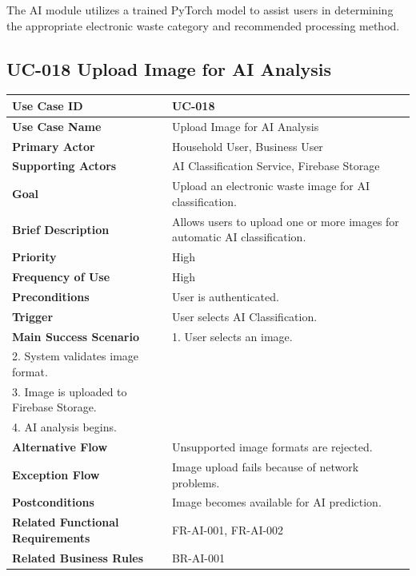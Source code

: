 The AI module utilizes a trained PyTorch model to assist users in
determining the appropriate electronic waste category and recommended
processing method.

\subsection{UC-018 Upload Image for AI Analysis}

\begin{longtable}{|p{4cm}|p{10cm}|}

\hline
\textbf{Use Case ID} &
UC-018 \\
\hline

\textbf{Use Case Name} &
Upload Image for AI Analysis \\
\hline

\textbf{Primary Actor} &
Household User, Business User \\
\hline

\textbf{Supporting Actors} &
AI Classification Service, Firebase Storage \\
\hline

\textbf{Goal} &
Upload an electronic waste image for AI classification. \\
\hline

\textbf{Brief Description} &
Allows users to upload one or more images for automatic AI
classification. \\
\hline

\textbf{Priority} &
High \\
\hline

\textbf{Frequency of Use} &
High \\
\hline

\textbf{Preconditions} &
User is authenticated. \\
\hline

\textbf{Trigger} &
User selects AI Classification. \\
\hline

\textbf{Main Success Scenario} &
1. User selects an image.\\
2. System validates image format.\\
3. Image is uploaded to Firebase Storage.\\
4. AI analysis begins.\\
\hline

\textbf{Alternative Flow} &
Unsupported image formats are rejected.\\
\hline

\textbf{Exception Flow} &
Image upload fails because of network problems.\\
\hline

\textbf{Postconditions} &
Image becomes available for AI prediction.\\
\hline

\textbf{Related Functional Requirements} &
FR-AI-001, FR-AI-002 \\
\hline

\textbf{Related Business Rules} &
BR-AI-001 \\
\hline

\end{longtable}

